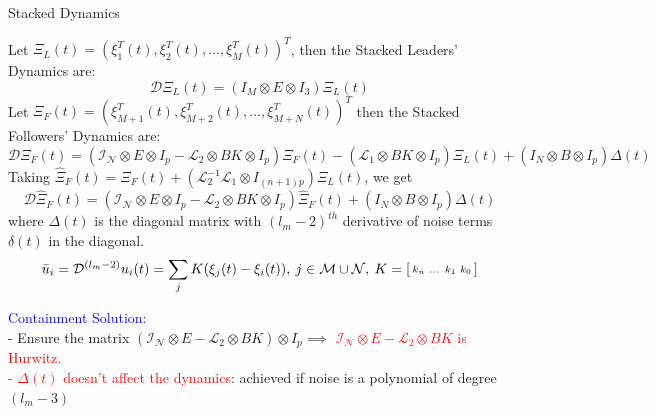 	\begin{frame}{Stacked Dynamics}%
		\vspace{-0.2cm}
		\begin{block}{}
			Let $\Xi_L(t)= (\xi_1^T(t),\xi_2^T(t),\dots, \xi_M^T(t))^T$, then the Stacked Leaders' Dynamics are:
			$$\boxed{\mathcal{D}\Xi_{L}(t)= (I_{M} \otimes E \otimes I_{3})\Xi_{L}(t)}$$
			Let $\Xi_F(t)= (\xi_{M+1}^T(t), \xi_{M+2}^T(t), \dots, \xi_{M+N}^T(t))^T$ then the Stacked Followers' Dynamics are:
			$$\boxed{\mathcal{D}\Xi_{F}(t)= (\mathcal{I}_{\mathcal{N}} \otimes E \otimes I_{p}-\mathcal{L}_2 \otimes BK \otimes I_{p}) \Xi_{F}(t) - (\mathcal{L}_1 \otimes BK \otimes I_{p}) \Xi_{L}(t)+ (I_{N} \otimes B \otimes I_{p}) \Delta(t)}$$
			Taking $\hat{\Xi}_{F}(t)=\Xi_{F}(t)+(\mathcal{L}_2^{-1}\mathcal{L}_1 \otimes I_{(n+1)p})\Xi_{L}(t)$, we get 
				$$\boxed{\mathcal{D}\hat{\Xi}_{F}(t)=(\mathcal{I}_{\mathcal{N}} \otimes E \otimes I_{p}-\mathcal{L}_2 \otimes BK \otimes I_{p})\hat{\Xi}_{F}(t)+(I_{N} \otimes B \otimes I_{p})\Delta(t)}$$
			where $\Delta(t)$ is the diagonal matrix with $(l_{m}-2)^{th}$ derivative of noise terms $\delta(t)$ in the diagonal.\\
			$$\bar{u}_{i}=\mathcal{D}^{(l_m-2)} u_{i}(t)=\sum_{j}K(\xi_{j}(t)-\xi_{i}(t)), \:		j \in \mathcal{M}\cup \mathcal{N}, \: K=\begin{bsmallmatrix}k_n & \dots & k_1 & k_0 \end{bsmallmatrix}$$
		\end{block}
		\pause
		\textcolor{blue}{Containment Solution: }\\
		- Ensure the matrix $(\mathcal{I}_{\mathcal{N}} \otimes E -\mathcal{L}_2 \otimes BK) \otimes I_{p} \implies $ \textcolor{red}{$ \mathcal{I}_{\mathcal{N}} \otimes E-\mathcal{L}_2 \otimes BK$ is Hurwitz.\\
			- $\Delta(t)$ doesn't affect the dynamics}: achieved if noise is a polynomial of degree $(l_{m}-3)$\\
	\end{frame}
